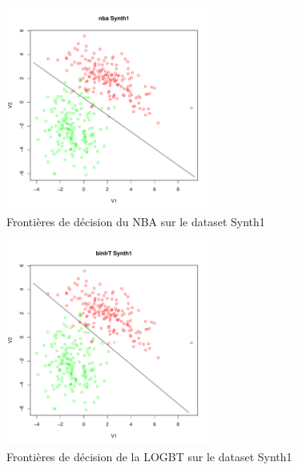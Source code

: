 \documentclass{report}
\begin{document}
\begin{figure}[ht!]
\begin{center}
    \includegraphics[width=0.6\textwidth]{results/nba/nba-Synth1.pdf}
    \caption{Frontières de décision du NBA sur le dataset Synth1}
\end{center}
\end{figure}

\begin{figure}[ht!]
\begin{center}
    \includegraphics[width=0.6\textwidth]{results/binlrt/binlrt-Synth1.pdf}
    \caption{Frontières de décision de la LOGBT sur le dataset Synth1}
\end{center}
\end{figure}
\end{document}

